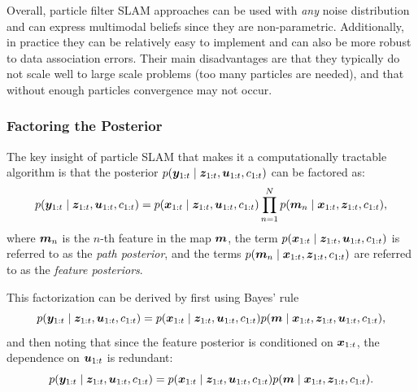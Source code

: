 Overall, particle filter SLAM approaches can be used with \textit{any} noise distribution and can express multimodal beliefs since they are non-parametric. Additionally, in practice they can be relatively easy to implement and can also be more robust to data association errors. Their main disadvantages are that they typically do not scale well to large scale problems (too many particles are needed), and that without enough particles convergence may not occur.

\subsubsection{Factoring the Posterior}
The key insight of particle SLAM that makes it a computationally tractable algorithm is that the posterior $p(\bm{y}_{1:t} \mid \bm{z}_{1:t}, \bm{u}_{1:t}, c_{1:t})$ can be factored as:
\begin{equation} \label{eq:factored}
p(\bm{y}_{1:t} \mid \bm{z}_{1:t}, \bm{u}_{1:t}, c_{1:t}) = p(\bm{x}_{1:t} \mid \bm{z}_{1:t}, \bm{u}_{1:t}, c_{1:t}) \prod_{n=1}^N p(\bm{m}_n \mid \bm{x}_{1:t}, \bm{z}_{1:t},  c_{1:t}),    
\end{equation}
where $\bm{m}_n$ is the $n$-th feature in the map $\bm{m}$, the term $p(\bm{x}_{1:t} \mid \bm{z}_{1:t}, \bm{u}_{1:t}, c_{1:t})$ is referred to as the \textit{path posterior}, and the terms $p(\bm{m}_n \mid \bm{x}_{1:t}, \bm{z}_{1:t},  c_{1:t})$ are referred to as the \textit{feature posteriors}. 

This factorization can be derived by first using Bayes' rule
\begin{equation*}
p(\bm{y}_{1:t} \mid \bm{z}_{1:t}, \bm{u}_{1:t}, c_{1:t}) = p(\bm{x}_{1:t} \mid \bm{z}_{1:t}, \bm{u}_{1:t}, c_{1:t}) p(\bm{m} \mid \bm{x}_{1:t}, \bm{z}_{1:t}, \bm{u}_{1:t},  c_{1:t}),    
\end{equation*}
and then noting that since the feature posterior is conditioned on $\bm{x}_{1:t}$, the dependence on $\bm{u}_{1:t}$ is redundant:\begin{equation*}
p(\bm{y}_{1:t} \mid \bm{z}_{1:t}, \bm{u}_{1:t}, c_{1:t}) = p(\bm{x}_{1:t} \mid \bm{z}_{1:t}, \bm{u}_{1:t}, c_{1:t}) p(\bm{m} \mid \bm{x}_{1:t}, \bm{z}_{1:t},  c_{1:t}).
\end{equation*}

